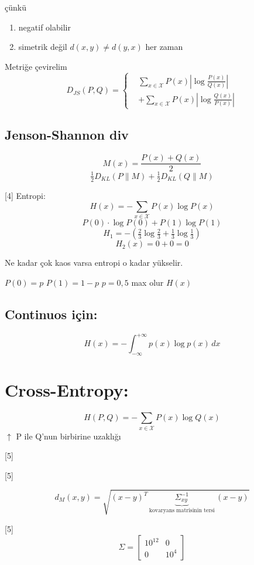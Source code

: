 \documentclass[11pt,a4paper]{article}
\begin{document}
çünkü
\begin{enumerate}[label=\arabic*)]
\item negatif olabilir
\item simetrik değil \quad $d(x,y)\neq d(y,x)$ her zaman
\end{enumerate}

Metriğe çevirelim
\[ D_{JS}(P,Q) = \left\{ \begin{aligned} & \sum_{x\in\mathcal{X}} P(x)\left|\log\frac{P(x)}{Q(x)}\right| \\ & + \sum_{x\in\mathcal{X}} P(x)\left|\log\frac{Q(x)}{P(x)}\right| \end{aligned} \right. \]

\subsection{Jenson-Shannon div}
\[ M(x) = \frac{P(x)+Q(x)}{2} \]
\[ \tfrac12 D_{KL}(P\|M) + \tfrac12 D_{KL}(Q\|M) \]

[4]
Entropi:
\[ H(x) = -\sum_{x\in\mathcal{X}} P(x)\log P(x) \]
\[ P(0)\cdot\log P(0) + P(1)\log P(1) \]
\[ H_1 = -\left(\tfrac23\log\tfrac23 + \tfrac13\log\tfrac13\right) \]
\[ H_2(x) = 0+0 = 0 \]

Ne kadar çok kaos varsa entropi o kadar yükselir.

$P(0)=p$ \qquad $P(1)=1-p$ \qquad $p=0{,}5$ max olur $H(x)$

\subsection{Continuos için:}
\[ H(x) = -\int_{-\infty}^{+\infty} p(x)\log p(x)\,dx \]

\section{Cross-Entropy:}
\[ H(P,Q) = -\sum_{x\in\mathcal{X}} P(x)\log Q(x) \]
$\uparrow$ P ile Q'nun birbirine uzaklığı

[5]

[5]

\[ d_M(x,y) = \sqrt{(x-y)^T\,\underbrace{\Sigma_{xy}^{-1}}_{\text{kovaryans matrisinin tersi}}\,(x-y)} \]

[5]
\[ \Sigma = \begin{bmatrix} 10^{12} & 0 \\ 0 & 10^{4} \end{bmatrix} \]
\end{document}
